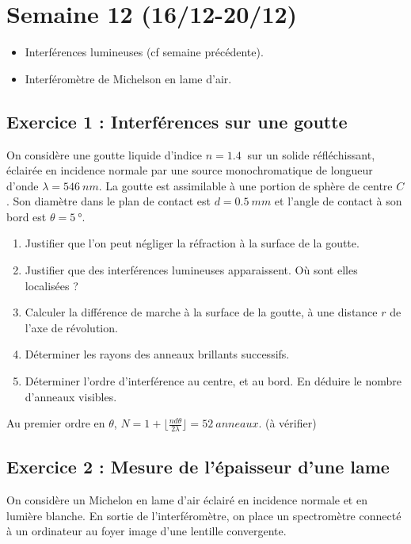 \section{Semaine 12 (16/12-20/12) }


\begin{itemize}
	\item Interférences lumineuses (cf semaine précédente).
	\item Interféromètre de Michelson en lame d'air.
\end{itemize}

\subsection{Exercice 1 : Interférences sur une goutte}

On considère une goutte liquide d'indice $n=\SI{1.4}{}$ sur un solide réfléchissant, éclairée en incidence normale par une source monochromatique de longueur d'onde $\lambda = \SI{546}{nm}$. La goutte est assimilable à une portion de sphère de centre $C$. Son diamètre dans le plan de contact est $d=\SI{0.5}{mm}$ et l'angle de contact à son bord est $\theta = \SI{5}{\degree}$. 

\begin{enumerate}
	\item Justifier que l'on peut négliger la réfraction à la surface de la goutte.
	\item Justifier que des interférences lumineuses apparaissent. Où sont elles localisées ?
	\item Calculer la différence de marche à la surface de la goutte, à une distance $r$ de l'axe de révolution.
	\item Déterminer les rayons des anneaux brillants successifs.
	\item Déterminer l'ordre d'interférence au centre, et au bord. En déduire le nombre d'anneaux visibles.
\end{enumerate}

 Au premier ordre en $\theta$, $N = 1 + \lfloor \frac{n d \theta}{2 \lambda}\rfloor = \SI{52}{anneaux}$. (à vérifier)

\subsection{Exercice 2 : Mesure de l'épaisseur d'une lame}

On considère un Michelon en lame d'air éclairé en incidence normale et en lumière blanche. En sortie de l'interféromètre, on place un spectromètre connecté à un ordinateur au foyer image d'une lentille convergente.

